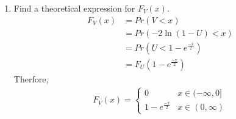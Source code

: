 \documentclass[journal,12pt,twocolumn]{IEEEtran}
\renewcommand\thesection{\arabic{section}}
\begin{document}
\begin{enumerate}[label=\thesection.\arabic*.,ref=\thesection.\theenumi]
\item Find a theoretical expression for $F_V (x)$.\\
\solution 
    \begin{align}
        F_V(x) &= Pr(V<x)\\
        &= Pr(-2\ln(1-U) < x)\\
        &= Pr(U<1-e^{\frac{-x}{2}}) \\
        &= F_U(1-e^{\frac{-x}{2}})
    \end{align}
    Therfore,
    \begin{align}
        F_V(x) = \begin{cases}
        0 & x \in (-\infty,0] \\
        1-e^{\frac{-x}{2}} & x \in (0,\infty)
    \end{cases} 
    \end{align}
\end{enumerate}
\end{document}
